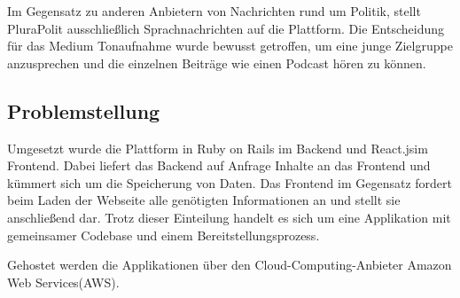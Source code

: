 Im Gegensatz zu anderen Anbietern von Nachrichten rund um Politik, stellt PluraPolit ausschließlich Sprachnachrichten auf die Plattform. Die Entscheidung für das Medium Tonaufnahme wurde bewusst getroffen, um eine junge Zielgruppe anzusprechen und die einzelnen Beiträge wie einen Podcast hören zu können.

\subsection{Problemstellung}

Umgesetzt wurde die Plattform in Ruby on Rails im Backend und React.js\footnotemark im Frontend. Dabei liefert das Backend auf Anfrage Inhalte an das Frontend und kümmert sich um die Speicherung von Daten. Das Frontend im Gegensatz fordert beim Laden der Webseite alle genötigten Informationen an und stellt sie anschließend dar. Trotz dieser Einteilung handelt es sich um eine Applikation mit gemeinsamer Codebase und einem Bereitstellungsprozess.


Gehostet werden die Applikationen über den Cloud-Computing-Anbieter Amazon Web Services\footnotemark (AWS).


